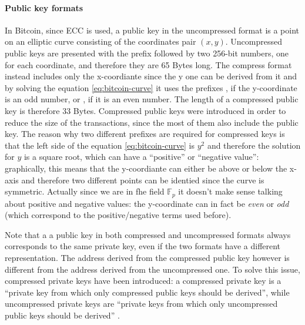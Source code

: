 \paragraph{Public key formats} In Bitcoin, since ECC is used, a public key in
the uncompressed format is a point on an elliptic curve consisting of the
coordinates pair $(x,y)$. Uncompressed public keys are presented with the prefix
 followed by two 256-bit numbers, one for each coordinate, and
therefore they are 65 Bytes long. The compress format instead includes only the
x-coordiante since the y one can be derived from it and by solving the equation
\eqref{eq:bitcoin-curve} it uses the prefixes , if the y-coordinate is an
odd number, or , if it is an even number. The length of a compressed
public key is therefore 33 Bytes. Compressed public keys were introduced in
order to reduce the size of the transactions, since the most of them also include
the public key. The reason why two different prefixes are required for
compressed keys is that the left side of the equation \eqref{eq:bitcoin-curve} is
$y^2$ and therefore the solution for $y$ is a square root, which can have a
``positive'' or ``negative value'': graphically, this means that the
y-coordiante can either be above or below the x-axis and therefore two different
points can be identied since the curve is symmetric. Actually since we are in
fhe field $\mathbb{F}_p$ it doesn't make sense talking about positive and
negative values: the y-coordinate can in fact be \emph{even} or \emph{odd}
(which correspond to the positive/negative terms used before).

Note that a a public key in both compressed and uncompressed formats always
corresponds to the same private key, even if the two formats have a different
representation. The address derived from the compressed public key however is
different from the address derived from the uncompressed one. To solve this
issue, compressed private keys have been introduced: a compressed private key is
a ``private key from which only compressed public keys should be derived'',
while uncompressed private keys are ``private keys from which only uncompressed
public keys should be derived'' \cite{antonopoulos2017mastering}.











